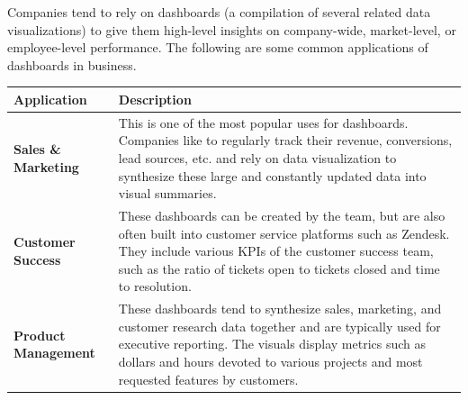 \documentclass[]{book}
\theoremstyle{definition}
\theoremstyle{definition}
\theoremstyle{definition}
\theoremstyle{remark}
\begin{document}
Companies tend to rely on dashboards (a compilation of several related
data visualizations) to give them high-level insights on company-wide,
market-level, or employee-level performance. The following are some
common applications of dashboards in business.

\begin{longtable}[]{@{}ll@{}}
\toprule
\begin{minipage}[b]{0.16\columnwidth}\raggedright\strut
\textbf{Application}\strut
\end{minipage} & \begin{minipage}[b]{0.78\columnwidth}\raggedright\strut
\textbf{Description}\strut
\end{minipage}\tabularnewline
\midrule
\endhead
\begin{minipage}[t]{0.16\columnwidth}\raggedright\strut
\textbf{Sales \& Marketing}\strut
\end{minipage} & \begin{minipage}[t]{0.78\columnwidth}\raggedright\strut
This is one of the most popular uses for dashboards. Companies like to
regularly track their revenue, conversions, lead sources, etc. and rely
on data visualization to synthesize these large and constantly updated
data into visual summaries.\strut
\end{minipage}\tabularnewline
\begin{minipage}[t]{0.16\columnwidth}\raggedright\strut
\textbf{Customer Success}\strut
\end{minipage} & \begin{minipage}[t]{0.78\columnwidth}\raggedright\strut
These dashboards can be created by the team, but are also often built
into customer service platforms such as Zendesk. They include various
KPIs of the customer success team, such as the ratio of tickets open to
tickets closed and time to resolution.\strut
\end{minipage}\tabularnewline
\begin{minipage}[t]{0.16\columnwidth}\raggedright\strut
\textbf{Product Management}\strut
\end{minipage} & \begin{minipage}[t]{0.78\columnwidth}\raggedright\strut
These dashboards tend to synthesize sales, marketing, and customer
research data together and are typically used for executive reporting.
The visuals display metrics such as dollars and hours devoted to various
projects and most requested features by customers.\strut
\end{minipage}\tabularnewline
\bottomrule
\end{longtable}
\end{document}
